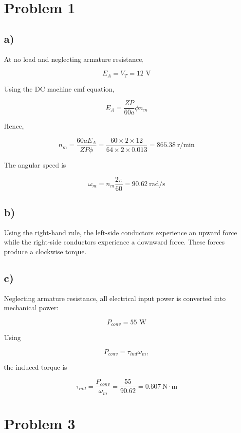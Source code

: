 \documentclass[12pt]{article}
\begin{document}
	
	\newpage
	\pagestyle{fancy}
	\fancyhf{}
	\cfoot{\thepage}


\newpage
\section{Problem 1}
\subsection*{a)}
At no load and neglecting armature resistance,

\[
E_A=V_T=12\text{ V}
\]

Using the DC machine emf equation,

\[
E_A=\frac{ZP}{60a}\phi n_m
\]

Hence,

\[
n_m=\frac{60aE_A}{ZP\phi}
=\frac{60\times2\times12}{64\times2\times0.013}
=865.38\ \text{r/min}
\]

The angular speed is

\[
\omega_m=n_m\frac{2\pi}{60}
=90.62\ \text{rad/s}
\]

\subsection{b)}
Using the right-hand rule, the left-side conductors experience an upward force while the right-side conductors experience a downward force. These forces produce a clockwise torque.



\subsection{c)}
Neglecting armature resistance, all electrical input power is converted into mechanical power:

\[
P_{conv}=55\text{ W}
\]

Using

\[
P_{conv}=\tau_{ind}\omega_m,
\]

the induced torque is

\[
\tau_{ind}=\frac{P_{conv}}{\omega_m}
=\frac{55}{90.62}
=0.607\ \text{N}\cdot\text{m}
\]

\section{Problem 3}
\end{document}
